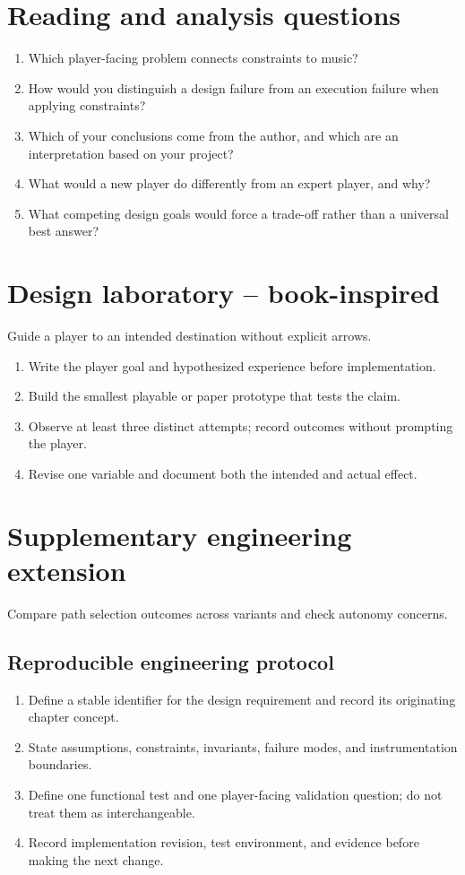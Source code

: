 \documentclass[11pt]{article}
\begin{document}
\section{Reading and analysis questions}
\begin{enumerate}
\item Which player-facing problem connects constraints to music?
\item How would you distinguish a design failure from an execution failure when applying constraints?
\item Which of your conclusions come from the author, and which are an interpretation based on your project?
\item What would a new player do differently from an expert player, and why?
\item What competing design goals would force a trade-off rather than a universal best answer?
\end{enumerate}

\section{Design laboratory -- book-inspired}
Guide a player to an intended destination without explicit arrows.

\begin{enumerate}
\item Write the player goal and hypothesized experience before implementation.
\item Build the smallest playable or paper prototype that tests the claim.
\item Observe at least three distinct attempts; record outcomes without prompting the player.
\item Revise one variable and document both the intended and actual effect.
\end{enumerate}

\section{Supplementary engineering extension}
Compare path selection outcomes across variants and check autonomy concerns.


\subsection{Reproducible engineering protocol}
\begin{enumerate}
\item Define a stable identifier for the design requirement and record its originating chapter concept.
\item State assumptions, constraints, invariants, failure modes, and instrumentation boundaries.
\item Define one functional test and one player-facing validation question; do not treat them as interchangeable.
\item Record implementation revision, test environment, and evidence before making the next change.
\end{enumerate}
\end{document}
